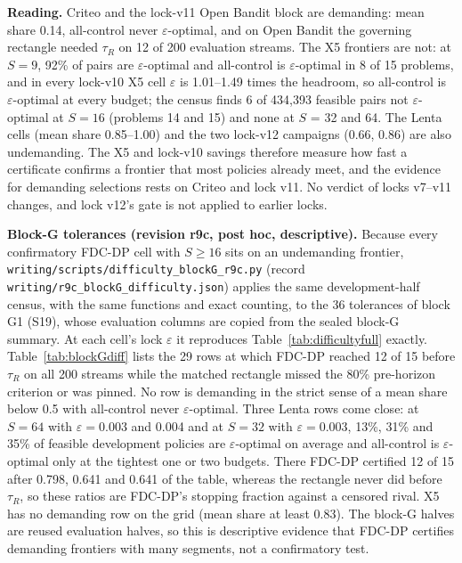 \documentclass[sigconf,anonymous,review]{acmart}
\newcommand{\eps}{\varepsilon}
\begin{document}
\textbf{Reading.} Criteo and the lock-v11 Open Bandit block are demanding: mean share 0.14, all-control never $\eps$-optimal, and on Open Bandit the governing rectangle needed $\tau_R$ on 12 of 200 evaluation streams. The X5 frontiers are not: at $S = 9$, 92\% of pairs are $\eps$-optimal and all-control is $\eps$-optimal in 8 of 15 problems, and in every lock-v10 X5 cell $\eps$ is 1.01--1.49 times the headroom, so all-control is $\eps$-optimal at every budget; the census finds 6 of 434,393 feasible pairs not $\eps$-optimal at $S = 16$ (problems 14 and 15) and none at $S$ = 32 and 64. The Lenta cells (mean share 0.85--1.00) and the two lock-v12 campaigns (0.66, 0.86) are also undemanding. The X5 and lock-v10 savings therefore measure how fast a certificate confirms a frontier that most policies already meet, and the evidence for demanding selections rests on Criteo and lock v11. No verdict of locks v7--v11 changes, and lock v12's gate is not applied to earlier locks.

\textbf{Block-G tolerances (revision r9c, post hoc, descriptive).} Because every confirmatory FDC-DP cell with $S \ge 16$ sits on an undemanding frontier, \texttt{writing/scripts/difficulty\_blockG\_r9c.py} (record \texttt{writing/r9c\_blockG\_difficulty.json}) applies the same development-half census, with the same functions and exact counting, to the 36 tolerances of block G1 (S19), whose evaluation columns are copied from the sealed block-G summary. At each cell's lock $\eps$ it reproduces Table~\ref{tab:difficultyfull} exactly. Table~\ref{tab:blockGdiff} lists the 29 rows at which FDC-DP reached 12 of 15 before $\tau_R$ on all 200 streams while the matched rectangle missed the 80\% pre-horizon criterion or was pinned. No row is demanding in the strict sense of a mean share below 0.5 with all-control never $\eps$-optimal. Three Lenta rows come close: at $S = 64$ with $\eps = 0.003$ and 0.004 and at $S = 32$ with $\eps = 0.003$, 13\%, 31\% and 35\% of feasible development policies are $\eps$-optimal on average and all-control is $\eps$-optimal only at the tightest one or two budgets. There FDC-DP certified 12 of 15 after 0.798, 0.641 and 0.641 of the table, whereas the rectangle never did before $\tau_R$, so these ratios are FDC-DP's stopping fraction against a censored rival. X5 has no demanding row on the grid (mean share at least 0.83). The block-G halves are reused evaluation halves, so this is descriptive evidence that FDC-DP certifies demanding frontiers with many segments, not a confirmatory test.

\begin{table}[t]
\caption{\textbf{Decision difficulty at the block-G tolerances} (post hoc, descriptive, revision r9c). Development-half census as in Table~\ref{tab:difficultyfull}; evaluation columns from the sealed block-G summary (S19). Rows: FDC-DP reached 12 of 15 before $\tau_R$ on all 200 streams and the rectangle missed the 80\% criterion (M) or was pinned (P). $^*$Exact bracket.}
\label{tab:blockGdiff}

\end{table}
\end{document}
